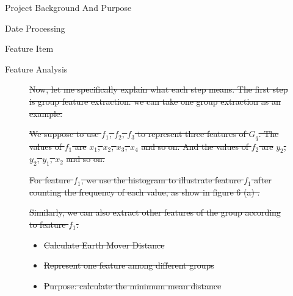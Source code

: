 \documentclass[
 size=14pt,
 paper=smartboard,  %
 mode=present, 		%
 display=slides, 	%
 style=tuliplab,  	%
 pauseslide,
 fleqn,leqno]{powerdot}
\providecommand{\DIFdeltex}[1]{{\protect\color{red}\sout{#1}}}                      %
\providecommand{\DIFdel}[1]{\texorpdfstring{\DIFdeltex{#1}}{}} %
\begin{document}
\begin{slide}
\begin{slide}{Project Background And Purpose}
\begin{slide}{Date Processing}
\begin{slide}{Feature Item}
\begin{slide}[toc=,bm=]{Feature Analysis}
\begin{figure}[htbp]
\DIFdel{Now, let me specifically explain what each step means.
The first step is group feature extraction.
we can take one group extraction as an example.
}%

\DIFdel{We suppose to use $f_1$, $f_2$, $f_3$ to represent three features of $G_q$.
The values of $f_1$ are }%
\DIFdel{$x_1$, $x_2$, $x_3$, $x_4$}%
\DIFdel{and so on.
And the values of $f_2$ are }%
\DIFdel{$y_2$,
 $y_2$, $y_1$, $x_2$}%
\DIFdel{and so on.
}%

\DIFdel{For feature $f_1$,
we use the histogram to illustrate feature $f_1$ after
counting the frequency of each value,
as show in figure 6 (a) 
 .
}%

\DIFdel{Similarly,
we can also extract other features of the group
according to feature $f_1$.
}%


\begin{itemize}%
\item%
\DIFdel{Calculate Earth Mover Distance
}%

\item%
\DIFdel{Represent one feature among different groups
}%

\item%
\DIFdel{Purpose: calculate the minimum mean distance
}
\end{itemize}%


\end{figure}
\end{slide}
\end{slide}
\end{slide}
\end{slide}
\end{slide}
\end{document}
